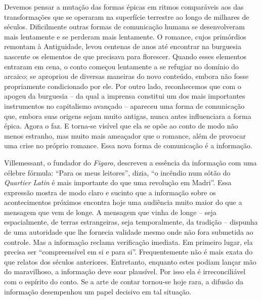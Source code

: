 Devemos pensar a mutação das formas épicas em ritmos comparáveis aos das
transformações que se operaram na superfície terrestre ao longo de
milhares de séculos. Dificilmente outras formas de comunicação humana se
desenvolveram mais lentamente e se perderam mais lentamente. O romance,
cujos primórdios remontam à Antiguidade, levou centenas de anos até
encontrar na burguesia nascente os elementos de que precisava para
florescer. Quando esses elementos entraram em cena, o conto começou
lentamente a se refugiar no domínio do arcaico; se apropriou de diversas
maneiras do novo conteúdo, embora não fosse propriamente condicionado
por ele. Por outro lado, reconhecemos que com o apogeu da burguesia --
da qual a imprensa constitui um dos mais importantes instrumentos no
capitalismo avançado -- apareceu uma forma de comunicação que, embora
suas origens sejam muito antigas, nunca antes influenciara a forma
épica. Agora o faz. E torna-se visível que ela se opõe ao conto de modo
não menos estranho, mas muito mais ameaçador que o romance, além de
provocar uma crise no próprio romance. Essa nova forma de comunicação é
a informação.

Villemessant, o fundador do \emph{Figaro}, descreveu a essência da
informação com uma célebre fórmula: ``Para os meus leitores'', dizia,
``o incêndio num sótão do \emph{Quartier Latin} é mais importante do que
uma revolução em Madri''. Essa expressão mostra de modo claro e sucinto
que a informação sobre os acontecimentos próximos encontra hoje uma
audiência muito maior do que a mensagem que vem de longe. A mensagem que
vinha de longe -- seja espacialmente, de terras estrangeiras, seja
temporalmente, da tradição -- dispunha de uma autoridade que lhe
fornecia validade mesmo onde não fora submetida ao controle. Mas a
informação reclama verificação imediata. Em primeiro lugar, ela precisa
ser ``compreensível em si e para si''. Frequentemente não é mais exata
do que relatos dos séculos anteriores. Entretanto, enquanto estes podiam
lançar mão do maravilhoso, a informação deve soar plausível. Por isso
ela é irreconciliável com o espírito do conto. Se a arte de contar
tornou-se hoje rara, a difusão da informação desempenhou um papel
decisivo em tal situação.

